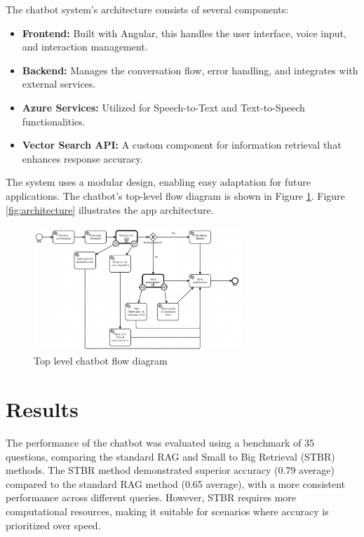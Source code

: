 \documentclass[a4paper,12pt,oneside]{ThesisStyle}
\begin{document}
The chatbot system's architecture consists of several components:

\begin{itemize}
    \item \textbf{Frontend:} Built with Angular, this handles the user interface, voice input, and interaction management.
    \item \textbf{Backend:} Manages the conversation flow, error handling, and integrates with external services.
    \item \textbf{Azure Services:} Utilized for Speech-to-Text and Text-to-Speech functionalities.
    \item \textbf{Vector Search API:} A custom component for information retrieval that enhances response accuracy.
\end{itemize}

The system uses a modular design, enabling easy adaptation for future applications. The chatbot's top-level flow diagram is shown in Figure \ref{fig:coversation_process}. Figure \ref{fig:architecture} illustrates the app architecture.

\begin{figure}[h]
    \centering
    \includegraphics[width=0.7\textwidth]{img/Conversation_process.bpmn20.png}
    \caption{Top level chatbot flow diagram}
    \label{fig:coversation_process}
\end{figure}

\section{Results}
\label{sec:results}

The performance of the chatbot was evaluated using a benchmark of 35 questions, comparing the standard RAG and Small to Big Retrieval (STBR) methods. The STBR method demonstrated superior accuracy (0.79 average) compared to the standard RAG method (0.65 average), with a more consistent performance across different queries. However, STBR requires more computational resources, making it suitable for scenarios where accuracy is prioritized over speed.
\end{document}
